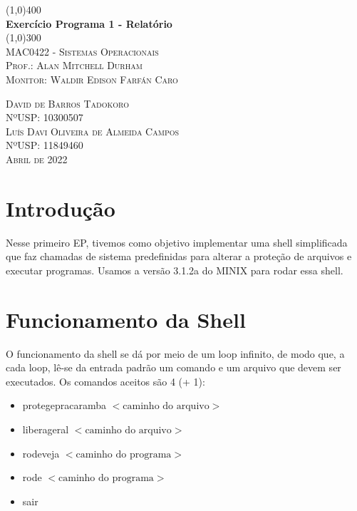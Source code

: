 \documentclass[a4paper, 12pt]{article}
\begin{document}
\begin{titlepage}
	\begin{center}
		\line(1,0){400} \\
		[0.25in]
		\huge{\bfseries Exercício Programa 1 - Relatório} \\
		[0.01in]
		\line(1,0){300} \\
		[0.5cm]
		\textsc{\Large MAC0422 - Sistemas Operacionais} \\
		[1.5cm]
		\textsc{\large Prof.: Alan Mitchell Durham}\\
		\textsc{\large Monitor: Waldir Edison Farfán Caro}\\
		[12cm]
	\end{center}
	\begin{flushright}
		\textsc{David de Barros Tadokoro}\\
		\textsc{NºUSP: 10300507}\\
		\textsc{Luís Davi Oliveira de Almeida Campos}\\
		\textsc{NºUSP: 11849460}\\
		\textsc{Abril de 2022}
	\end{flushright}
\end{titlepage}

\newpage

\section{Introdução}

Nesse primeiro EP, tivemos como objetivo implementar uma shell simplificada que faz chamadas de sistema predefinidas para alterar a proteção de arquivos e executar programas. Usamos a versão 3.1.2a do MINIX para rodar essa shell.

\section{Funcionamento da Shell}

O funcionamento da shell se dá por meio de um loop infinito, de modo que, a cada loop, lê-se da entrada padrão um comando e um arquivo que devem ser executados. Os comandos aceitos são 4 (+ 1):

\begin{itemize}
	\item protegepracaramba $<\textrm{caminho do arquivo}>$
	\item liberageral $<\textrm{caminho do arquivo}>$
	\item rodeveja $<\textrm{caminho do programa}>$
	\item rode $<\textrm{caminho do programa}>$
	\item sair
\end{itemize}
\end{document}
